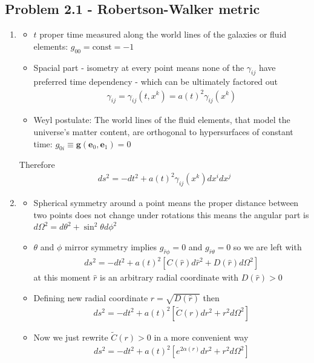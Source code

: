 \documentclass[10pt,a4paper]{book}
\theoremstyle{definition}
\begin{document}
\subsection{Problem 2.1 - Robertson-Walker metric}
\begin{enumerate}
\item 
\begin{itemize}
\item $t$ proper time measured along the world lines of the galaxies or fluid elements: $g_{00}=\text{const}=-1$
\item Spacial part - isometry at every point means none of the $\gamma_{ij}$ have preferred time dependency -  which can be ultimately factored out 
\begin{align}
\gamma_{ij}=\gamma_{ij}(t,x^k)=a(t)^2\gamma_{ij}(x^k)
\end{align} 
\item Weyl postulate: The world lines of the fluid elements, that model the universe’s matter content, are orthogonal to hypersurfaces of constant time: $g_{0i}\equiv\mathbf{g}(\mathbf{e}_0,\mathbf{e}_1)=0$
\end{itemize}
Therefore
\begin{align}
ds^2=-dt^2+a(t)^2\gamma_{ij}(x^k)dx^idx^j
\end{align}
\item 
\begin{itemize}
\item Spherical symmetry around a point means the proper distance between two points does not change under rotations this means the angular part is $d\Omega^2=d\theta^2+\sin^2\theta d\phi^2$
\item $\theta$ and $\phi$ mirror symmetry implies $g_{\hat{r}\phi}=0$ and $g_{\hat{r}\theta}=0$ so we are left with
\begin{align}
ds^2=-dt^2+a(t)^2\left[C(\hat{r})d\hat{r}^2+D(\hat{r})d\Omega^2\right]
\end{align}
at this moment $\hat{r}$ is an arbitrary radial coordinate with $D(\hat{r})>0$
\item Defining new radial coordinate $r=\sqrt{D(\hat{r})}$ then
\begin{align}
ds^2=-dt^2+a(t)^2\left[\tilde{C}(r)dr^2+r^2d\Omega^2\right]
\end{align}
\item Now we just rewrite $\tilde{C}(r)>0$ in a more convenient way
\begin{align}
ds^2=-dt^2+a(t)^2\left[e^{2\alpha(r)}dr^2+r^2d\Omega^2\right]
\end{align}

\end{itemize}
\end{enumerate}
\end{document}
